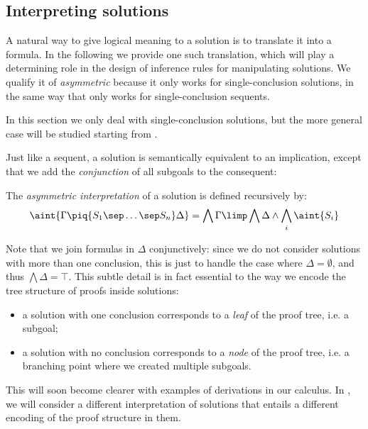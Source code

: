 \subsection{Interpreting solutions}

A natural way to give logical meaning to a solution is to translate it into a
formula. In the following we provide one such translation, which will play a
determining role in the design of inference rules for manipulating solutions. We
qualify it of \emph{asymmetric} because it only works for single-conclusion
solutions, in the same way that  only works for single-conclusion
sequents.

\begin{remark}
In this section we only deal with single-conclusion solutions, but the more
general case will be studied starting from .
\end{remark}

Just like a sequent, a solution is semantically equivalent to an implication,
except that we add the \emph{conjunction} of all subgoals to the consequent:

\begin{definition}
  The \emph{asymmetric interpretation} of a solution is defined recursively by:
  $$\aint{\Gamma \piq{S_1 \sep \ldots \sep S_n} \Delta} = \bigwedge \Gamma
    \limp \bigwedge \Delta \land \bigwedge_i{\aint{S_i}}$$
\end{definition}

Note that we join formulas in $\Delta$ conjunctively: since we do not consider
solutions with more than one conclusion, this is just to handle the case where
$\Delta = \emptyset$, and thus $\bigwedge \Delta = \top$. This subtle detail is
in fact essential to the way we encode the tree structure of proofs inside
solutions:
\begin{itemize}
  \item a solution with one conclusion corresponds to a \emph{leaf} of the proof
  tree, i.e. a subgoal;
  \item a solution with no conclusion corresponds to a \emph{node} of the proof
  tree, i.e. a branching point where we created multiple subgoals.
\end{itemize}
This will soon become clearer with examples of derivations in our calculus. In
, we will consider a different interpretation of solutions that
entails a different encoding of the proof structure in them.

